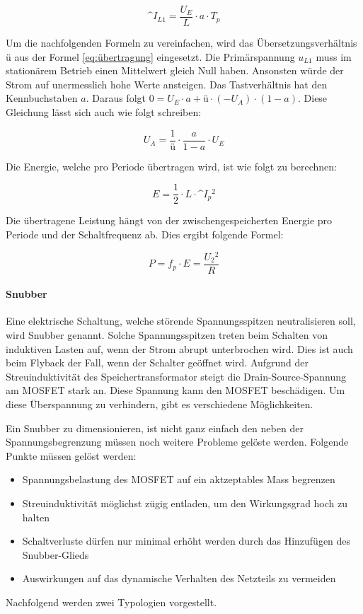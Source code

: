 \begin{equation}\label{eq:strom}
\^{I}_{L1}=\frac{U_{E}}{L}\cdot a \cdot T_{p}
\end{equation}

Um die nachfolgenden Formeln zu vereinfachen, wird das Übersetzungsverhältnis $ ü $ aus der Formel \ref{eq:übertragung} eingesetzt. Die Primärspannung $ u_{L1} $ muss im stationärem Betrieb einen Mittelwert gleich Null haben. Ansonsten würde der Strom auf unermesslich hohe Werte ansteigen. Das Tastverhältnis hat den Kennbuchstaben $ a $. Daraus folgt $ 0= U_{E} \cdot a + ü \cdot (-U_{A}) \cdot (1-a) $. Diese Gleichung lässt sich auch wie folgt schreiben:

\begin{equation}\label{eq:ausgangsspannung}
U_{A}= \frac{1}{ü} \cdot \frac{a}{1-a} \cdot U_{E}
\end{equation}

Die Energie, welche pro Periode übertragen wird, ist wie folgt zu berechnen:

\begin{equation}\label{eq:energie}
E= \frac{1}{2} \cdot L \cdot \^{I}_{p}\!^{2}
\end{equation}

Die übertragene Leistung hängt von der zwischengespeicherten Energie pro Periode und der Schaltfrequenz ab. Dies ergibt folgende Formel:

\begin{equation}\label{eq:Leistung}
P= f_{p} \cdot E = \frac{U_{2}\!^{2}}{R}
\end{equation}

\paragraph{Snubber}
Eine elektrische Schaltung, welche störende Spannungsspitzen neutralisieren soll, wird Snubber genannt. Solche Spannungsspitzen treten beim Schalten von induktiven Lasten auf, wenn der Strom abrupt unterbrochen wird. Dies ist auch beim Flyback der Fall, wenn der Schalter geöffnet wird. Aufgrund der Streuinduktivität des Speichertransformator steigt die Drain-Source-Spannung am MOSFET stark an. Diese Spannung kann den MOSFET beschädigen. Um diese Überspannung zu verhindern, gibt es verschiedene Möglichkeiten.

Ein Snubber zu dimensionieren, ist nicht ganz einfach den neben der Spannungsbegrenzung müssen noch weitere Probleme gelöste werden. Folgende Punkte müssen gelöst werden:
\begin{itemize}
	\item Spannungsbelastung des MOSFET auf ein aktzeptables Mass begrenzen
	\item Streuinduktivität möglichst zügig entladen, um den Wirkungsgrad hoch zu halten
	\item Schaltverluste dürfen nur minimal erhöht werden durch das Hinzufügen des Snubber-Glieds
	\item Auswirkungen auf das dynamische Verhalten des Netzteils zu vermeiden
\end{itemize}
Nachfolgend werden zwei Typologien vorgestellt.


